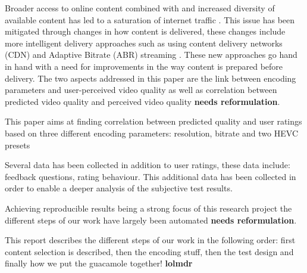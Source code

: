 Broader access to online content \cite{forecast2016cisco} combined with and increased diversity of available content has led to a saturation of internet traffic \cite{sandvine2010global}. This issue has been mitigated through changes in how content is delivered, these changes include more intelligent delivery approaches such as using content delivery networks (CDN)\cite{farber2003internet} and Adaptive Bitrate (ABR) streaming \cite{brueck2010apparatus}. These new approaches go hand in hand with a need for improvements in the way content is prepared before delivery. The two aspects addressed in this paper are the link between encoding parameters and user-perceived video quality as well as correlation between predicted video quality and perceived video quality \textbf{needs reformulation}.

This paper aims at finding correlation between predicted quality and user ratings based on three different encoding parameters: resolution, bitrate and two HEVC presets

Several data has been collected in addition to user ratings, these data include: feedback questions, rating behaviour. This additional data has been collected in order to enable a deeper analysis of the subjective test results.

Achieving reproducible results being a strong focus of this research project the different steps of our work have largely been automated \textbf{needs reformulation}.

This report describes the different steps of our work in the following order: first content selection is described, then the encoding stuff, then the test design and finally how we put the guacamole together! \textbf{lolmdr}